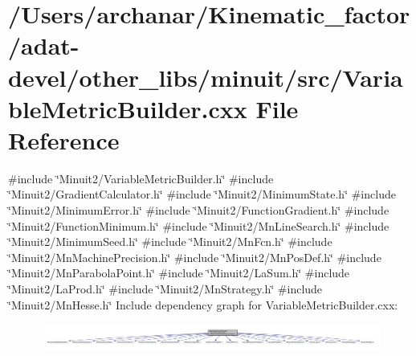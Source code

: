 \hypertarget{adat-devel_2other__libs_2minuit_2src_2VariableMetricBuilder_8cxx}{}\section{/\+Users/archanar/\+Kinematic\+\_\+factor/adat-\/devel/other\+\_\+libs/minuit/src/\+Variable\+Metric\+Builder.cxx File Reference}
\label{adat-devel_2other__libs_2minuit_2src_2VariableMetricBuilder_8cxx}
{\ttfamily \#include \char`\"{}Minuit2/\+Variable\+Metric\+Builder.\+h\char`\"{}}\newline
{\ttfamily \#include \char`\"{}Minuit2/\+Gradient\+Calculator.\+h\char`\"{}}\newline
{\ttfamily \#include \char`\"{}Minuit2/\+Minimum\+State.\+h\char`\"{}}\newline
{\ttfamily \#include \char`\"{}Minuit2/\+Minimum\+Error.\+h\char`\"{}}\newline
{\ttfamily \#include \char`\"{}Minuit2/\+Function\+Gradient.\+h\char`\"{}}\newline
{\ttfamily \#include \char`\"{}Minuit2/\+Function\+Minimum.\+h\char`\"{}}\newline
{\ttfamily \#include \char`\"{}Minuit2/\+Mn\+Line\+Search.\+h\char`\"{}}\newline
{\ttfamily \#include \char`\"{}Minuit2/\+Minimum\+Seed.\+h\char`\"{}}\newline
{\ttfamily \#include \char`\"{}Minuit2/\+Mn\+Fcn.\+h\char`\"{}}\newline
{\ttfamily \#include \char`\"{}Minuit2/\+Mn\+Machine\+Precision.\+h\char`\"{}}\newline
{\ttfamily \#include \char`\"{}Minuit2/\+Mn\+Pos\+Def.\+h\char`\"{}}\newline
{\ttfamily \#include \char`\"{}Minuit2/\+Mn\+Parabola\+Point.\+h\char`\"{}}\newline
{\ttfamily \#include \char`\"{}Minuit2/\+La\+Sum.\+h\char`\"{}}\newline
{\ttfamily \#include \char`\"{}Minuit2/\+La\+Prod.\+h\char`\"{}}\newline
{\ttfamily \#include \char`\"{}Minuit2/\+Mn\+Strategy.\+h\char`\"{}}\newline
{\ttfamily \#include \char`\"{}Minuit2/\+Mn\+Hesse.\+h\char`\"{}}\newline
Include dependency graph for Variable\+Metric\+Builder.\+cxx\+:
\nopagebreak
\begin{figure}[H]
\begin{center}
\leavevmode
\includegraphics[width=350pt]{dc/d5c/adat-devel_2other__libs_2minuit_2src_2VariableMetricBuilder_8cxx__incl}
\end{center}
\end{figure}
